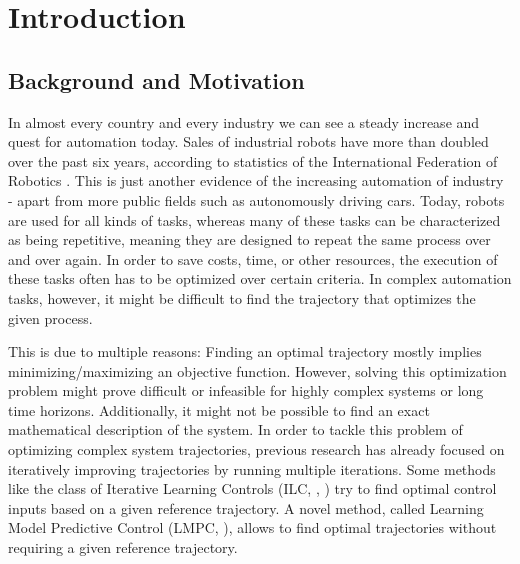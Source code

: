 \chapter{Introduction}
\section{Background and Motivation}
In almost every country and every industry we can see a steady increase and quest for automation today. Sales of industrial robots have more than doubled over the past six years, according to statistics of the International Federation of Robotics \cite{IFR2016}. This is just another evidence of the increasing automation of industry - apart from more public fields such as autonomously driving cars. Today, robots are used for all kinds of tasks, whereas many of these tasks can be characterized as being repetitive, meaning they are designed to repeat the same process over and over again. In order to save costs, time, or other resources, the execution of these tasks often has to be optimized over certain criteria. In complex automation tasks, however, it might be difficult to find the trajectory that optimizes the given process.

This is due to multiple reasons: Finding an optimal trajectory mostly implies minimizing/maximizing an objective function. However, solving this optimization problem might prove difficult or infeasible for highly complex systems or long time horizons. Additionally, it might not be possible to find an exact mathematical description of the system.
In order to tackle this problem of optimizing complex system trajectories, previous research has already focused on iteratively improving trajectories by running multiple iterations. Some methods like the class of Iterative Learning Controls (ILC, \cite{Lee2007}, \cite{Bristow2006}) try to find optimal control inputs based on a given reference trajectory. A novel method, called Learning Model Predictive Control (LMPC, \cite{Rosolia2016}), allows to find optimal trajectories without requiring a given reference trajectory.

